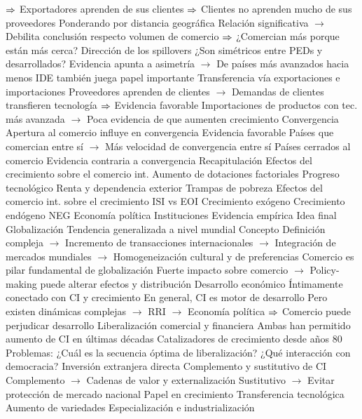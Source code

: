 \documentclass{nuevotema}
\begin{document}
\begin{esquemal}
				\4[] $\Rightarrow$ Exportadores aprenden de sus clientes
				\4[] $\Rightarrow$ Clientes no aprenden mucho de sus proveedores
				\4 Ponderando por distancia geográfica
				\4[] Relación significativa
				\4[] $\to$ Debilita conclusión respecto volumen de comercio
				\4[] $\Rightarrow$ ¿Comercian más porque están más cerca?
				\4 Dirección de los spillovers
				\4[] ¿Son simétricos entre PEDs y desarrollados?
				\4[] Evidencia apunta a asimetría
				\4[] $\to$ De países más avanzados hacia menos
				\4[] IDE también juega papel importante
				\4 Transferencia vía exportaciones e importaciones
				\4[] Proveedores aprenden de clientes
				\4[] $\to$ Demandas de clientes transfieren tecnología
				\4[] $\Rightarrow$ Evidencia favorable
				\4[] Importaciones de productos con tec. más avanzada
				\4[] $\to$ Poca evidencia de que aumenten crecimiento
			\3 Convergencia
				\4 Apertura al comercio influye en convergencia
				\4[] Evidencia favorable
				\4[] Países que comercian entre sí
				\4[] $\to$ Más velocidad de convergencia entre sí
				\4 Países cerrados al comercio
				\4[] Evidencia contraria a convergencia
	\1[] 
		\2 Recapitulación
			\3 Efectos del crecimiento sobre el comercio int.
				\4 Aumento de dotaciones factoriales
				\4 Progreso tecnológico
				\4 Renta y dependencia exterior
				\4 Trampas de pobreza
			\3 Efectos del comercio int. sobre el crecimiento
				\4 ISI vs EOI
				\4 Crecimiento exógeno
				\4 Crecimiento endógeno
				\4 NEG
				\4 Economía política
				\4 Instituciones
				\4 Evidencia empírica
		\2 Idea final
			\3 Globalización
				\4 Tendencia generalizada a nivel mundial
				\4 Concepto
				\4[] Definición compleja
				\4[] $\to$ Incremento de transacciones internacionales
				\4[] $\to$ Integración de mercados mundiales
				\4[] $\to$ Homogeneización cultural y de preferencias
				\4 Comercio es pilar fundamental de globalización
				\4[] Fuerte impacto sobre comercio
				\4[] $\to$ Policy-making puede alterar efectos y distribución
			\3 Desarrollo económico
				\4 Íntimamente conectado con CI y crecimiento
				\4 En general, CI es motor de desarrollo
				\4[] Pero existen dinámicas complejas
				\4[] $\to$ RRI
				\4[] $\to$ Economía política
				\4[] $\Rightarrow$ Comercio puede perjudicar desarrollo
			\3 Liberalización comercial y financiera
				\4 Ambas han permitido aumento de CI en últimas décadas
				\4 Catalizadores de crecimiento desde años 80
				\4 Problemas:
				\4[] ¿Cuál es la secuencia óptima de liberalización?
				\4[] ¿Qué interacción con democracia?
			\3 Inversión extranjera directa
				\4 Complemento y sustitutivo de CI
				\4[] Complemento
				\4[] $\to$ Cadenas de valor y externalización
				\4[] Sustitutivo
				\4[] $\to$ Evitar protección de mercado nacional
				\4 Papel en crecimiento
				\4[] Transferencia tecnológica
				\4[] Aumento de variedades
				\4[] Especialización e industrialización
\end{esquemal}
\end{document}
